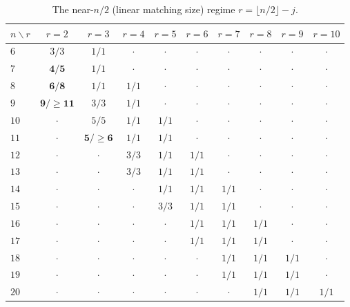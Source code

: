 \begin{table}[t]\centering\small
\begin{tabular}{@{}lccccccccc@{}}
\toprule
$n \backslash r$ & $r=2$ & $r=3$ & $r=4$ & $r=5$ & $r=6$ & $r=7$ & $r=8$ & $r=9$ & $r=10$ \\
\midrule
$6$ & $3/3$ & $1/1$ & $\cdot$ & $\cdot$ & $\cdot$ & $\cdot$ & $\cdot$ & $\cdot$ & $\cdot$ \\
$7$ & $\mathbf{4/5}$ & $1/1$ & $\cdot$ & $\cdot$ & $\cdot$ & $\cdot$ & $\cdot$ & $\cdot$ & $\cdot$ \\
$8$ & $\mathbf{6/8}$ & $1/1$ & $1/1$ & $\cdot$ & $\cdot$ & $\cdot$ & $\cdot$ & $\cdot$ & $\cdot$ \\
$9$ & $\mathbf{9/\ge 11}$ & $3/3$ & $1/1$ & $\cdot$ & $\cdot$ & $\cdot$ & $\cdot$ & $\cdot$ & $\cdot$ \\
$10$ & $\cdot$ & $5/5$ & $1/1$ & $1/1$ & $\cdot$ & $\cdot$ & $\cdot$ & $\cdot$ & $\cdot$ \\
$11$ & $\cdot$ & $\mathbf{5/\ge 6}$ & $1/1$ & $1/1$ & $\cdot$ & $\cdot$ & $\cdot$ & $\cdot$ & $\cdot$ \\
$12$ & $\cdot$ & $\cdot$ & $3/3$ & $1/1$ & $1/1$ & $\cdot$ & $\cdot$ & $\cdot$ & $\cdot$ \\
$13$ & $\cdot$ & $\cdot$ & $3/3$ & $1/1$ & $1/1$ & $\cdot$ & $\cdot$ & $\cdot$ & $\cdot$ \\
$14$ & $\cdot$ & $\cdot$ & $\cdot$ & $1/1$ & $1/1$ & $1/1$ & $\cdot$ & $\cdot$ & $\cdot$ \\
$15$ & $\cdot$ & $\cdot$ & $\cdot$ & $3/3$ & $1/1$ & $1/1$ & $\cdot$ & $\cdot$ & $\cdot$ \\
$16$ & $\cdot$ & $\cdot$ & $\cdot$ & $\cdot$ & $1/1$ & $1/1$ & $1/1$ & $\cdot$ & $\cdot$ \\
$17$ & $\cdot$ & $\cdot$ & $\cdot$ & $\cdot$ & $1/1$ & $1/1$ & $1/1$ & $\cdot$ & $\cdot$ \\
$18$ & $\cdot$ & $\cdot$ & $\cdot$ & $\cdot$ & $\cdot$ & $1/1$ & $1/1$ & $1/1$ & $\cdot$ \\
$19$ & $\cdot$ & $\cdot$ & $\cdot$ & $\cdot$ & $\cdot$ & $1/1$ & $1/1$ & $1/1$ & $\cdot$ \\
$20$ & $\cdot$ & $\cdot$ & $\cdot$ & $\cdot$ & $\cdot$ & $\cdot$ & $1/1$ & $1/1$ & $1/1$ \\
\bottomrule
\end{tabular}
\caption{The near-$n/2$ (linear matching size) regime $r=\lfloor n/2\rfloor-j$.}
\label{tab:extremal}
\end{table}
